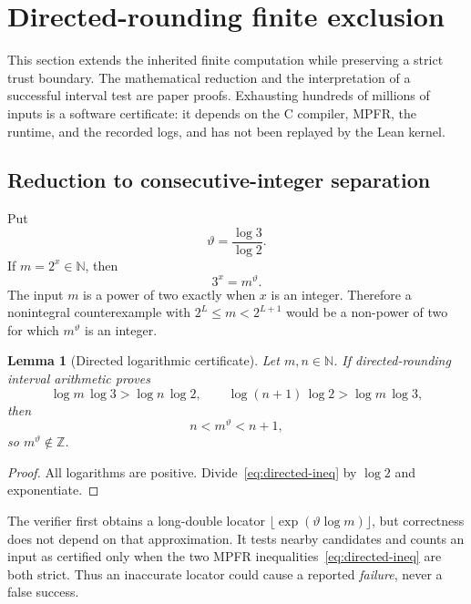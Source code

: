 \documentclass[11pt]{article}
\newcommand{\N}{\mathbb N}
\newcommand{\Z}{\mathbb Z}
\newcommand{\1}{\mathbf 1}
\theoremstyle{plain}
\newtheorem{lemma}[theorem]{Lemma}
\theoremstyle{definition}
\theoremstyle{remark}
\begin{document}
\section{Directed-rounding finite exclusion}
\label{sec:finite}

This section extends the inherited finite computation while preserving a
strict trust boundary.  The mathematical reduction and the interpretation of
a successful interval test are paper proofs.  Exhausting hundreds of millions
of inputs is a software certificate: it depends on the C compiler, MPFR, the
runtime, and the recorded logs, and has not been replayed by the Lean kernel.

\subsection{Reduction to consecutive-integer separation}

Put
\begin{equation}\label{eq:theta}
 \vartheta=\frac{\log3}{\log2}.
\end{equation}
If $m=2^x\in\N$, then
\begin{equation}\label{eq:mtheta}
 3^x=m^\vartheta.
\end{equation}
The input $m$ is a power of two exactly when $x$ is an integer.  Therefore a
nonintegral counterexample with $2^L\le m<2^{L+1}$ would be a non-power of two
for which $m^\vartheta$ is an integer.

\begin{lemma}[Directed logarithmic certificate]\label{lem:directed-cert}
Let $m,n\in\N$.  If directed-rounding interval arithmetic proves
\begin{equation}\label{eq:directed-ineq}
 \log m\,\log3>\log n\,\log2,
 \qquad
 \log(n+1)\,\log2>\log m\,\log3,
\end{equation}
then
\[
 n<m^\vartheta<n+1,
\]
so $m^\vartheta\notin\Z$.
\end{lemma}

\begin{proof}
All logarithms are positive.  Divide~\eqref{eq:directed-ineq} by
$\log2$ and exponentiate.
\end{proof}

The verifier first obtains a long-double locator
$\lfloor\exp(\vartheta\log m)\rfloor$, but correctness does not depend on that
approximation.  It tests nearby candidates and counts an input as certified
only when the two MPFR inequalities~\eqref{eq:directed-ineq} are both strict.
Thus an inaccurate locator could cause a reported \emph{failure}, never a
false success.
\end{document}
